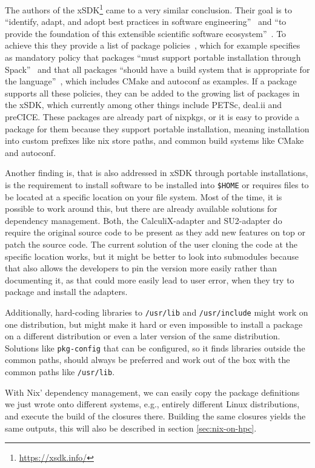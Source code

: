 \documentclass{eceasst}
\begin{document}
The authors of the xSDK\footnote{\url{https://xsdk.info/}} came to a very similar conclusion.
Their goal is to ``identify, adapt, and adopt best practices in software engineering''~\cite{xsdk-website} and ``to provide the foundation of this extensible scientific software ecosystem''~\cite{xsdk-website}.
To achieve this they provide a list of package policies~\cite{xSDK2023}, which for example specifies as mandatory policy that packages ``must support portable installation through Spack''~\cite{xSDK2023} and that all packages ``should have a build system that is appropriate for the language''~\cite{xSDK2023}, which includes CMake and autoconf as examples.
If a package supports all these policies, they can be added to the growing list of packages in the xSDK, which currently among other things include PETSc, deal.ii and preCICE.
These packages are already part of nixpkgs, or it is easy to provide a package for them because they support portable installation, meaning installation into custom prefixes like nix store paths, and common build systems like CMake and autoconf.

Another finding is, that is also addressed in xSDK through portable installations, is the requirement to install software to be installed into \texttt{\$HOME} or requires files to be located at a specific location on your file system.
Most of the time, it is possible to work around this, but there are already available solutions for dependency management.
Both, the CalculiX-adapter and SU2-adapter do require the original source code to be present as they add new features on top or patch the source code.
The current solution of the user cloning the code at the specific location works, but it might be better to look into submodules because that also allows the developers to pin the version more easily rather than documenting it, as that could more easily lead to user error, when they try to package and install the adapters.

Additionally, hard-coding libraries to \texttt{/usr/lib} and \texttt{/usr/include} might work on one distribution, but might make it hard or even impossible to install a package on a different distribution or even a later version of the same distribution.
Solutions like \texttt{pkg-config} that can be configured, so it finds libraries outside the common paths, should always be preferred and work out of the box with the common paths like \texttt{/usr/lib}.

With Nix' dependency management, we can easily copy the package definitions we just wrote onto different systems, e.g., entirely different Linux distributions, and execute the build of the closures there.
Building the same closures yields the same outputs, this will also be described in section \ref{sec:nix-on-hpc}.
\end{document}
